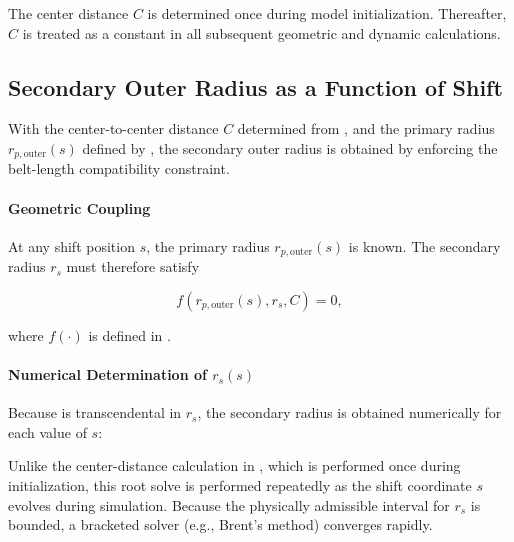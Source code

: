 \documentclass[11pt]{article}
\numberwithin{equation}{section}
\begin{document}
\begin{remarkbox}
The center distance $C$ is determined once during model
initialization. Thereafter, $C$ is treated as a constant
in all subsequent geometric and dynamic calculations.
\end{remarkbox}



\subsection{Secondary Outer Radius as a Function of Shift}
\label{sec:secondary_radius}

With the center-to-center distance $C$ determined from
, and the primary radius
$r_{p,\text{outer}}(s)$ defined by , the secondary
outer radius is obtained by enforcing the belt-length
compatibility constraint.

\paragraph{Geometric Coupling}

At any shift position $s$, the primary radius
$r_{p,\text{outer}}(s)$ is known. The secondary radius $r_s$
must therefore satisfy

\begin{equation}
f\!\left(r_{p,\text{outer}}(s), r_s, C\right) = 0,
\label{eq:secondary_radius_constraint}
\end{equation}

where $f(\cdot)$ is defined in .

\paragraph{Numerical Determination of $r_s(s)$}

Because  is transcendental
in $r_s$, the secondary radius is obtained numerically for
each value of $s$:


\begin{remarkbox}
Unlike the center-distance calculation in
, which is performed once during
initialization, this root solve is performed repeatedly
as the shift coordinate $s$ evolves during simulation.
Because the physically admissible interval for $r_s$ is bounded,
a bracketed solver (e.g., Brent’s method) converges rapidly.
\end{remarkbox}
\end{document}
